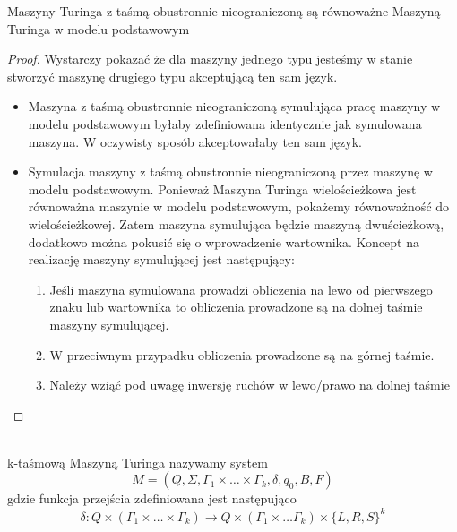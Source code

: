 \begin{tw}
	Maszyny Turinga z taśmą obustronnie nieograniczoną są równoważne Maszyną Turinga w modelu podstawowym
	
	\begin{proof}
	Wystarczy pokazać że dla maszyny jednego typu jesteśmy w stanie stworzyć maszynę drugiego typu akceptującą ten sam
	język.
	\begin{itemize}
		\item Maszyna z taśmą obustronnie nieograniczoną symulująca pracę maszyny w modelu podstawowym byłaby
		zdefiniowana identycznie jak symulowana maszyna.	W oczywisty sposób akceptowałaby ten sam język.
		\item Symulacja maszyny z taśmą obustronnie nieograniczoną przez maszynę w modelu podstawowym. 
		Ponieważ Maszyna Turinga wielościeżkowa jest równoważna maszynie w modelu podstawowym, pokażemy
		równoważność do wielościeżkowej. Zatem maszyna symulująca będzie maszyną dwuścieżkową, dodatkowo można pokusić się o 
		wprowadzenie wartownika. Koncept na realizację maszyny symulującej jest następujący:
			\begin{enumerate}
				\item Jeśli maszyna symulowana prowadzi obliczenia na lewo od pierwszego znaku lub wartownika
				to obliczenia prowadzone są na dolnej taśmie maszyny symulującej.
				\item W przeciwnym przypadku obliczenia prowadzone są na górnej taśmie.
				\item Należy wziąć pod uwagę inwersję ruchów w lewo/prawo na dolnej taśmie
			\end{enumerate}
	\end{itemize}
	\end{proof}
\end{tw}

\begin{df}~\\
	k-taśmową Maszyną Turinga nazywamy system
	\begin{equation}
		M = (Q, \Sigma, \Gamma_1\times\dots\times\Gamma_k, \delta, q_0, B, F)
	\end{equation}
	gdzie funkcja przejścia zdefiniowana jest następująco
	\begin{equation}
		\delta: Q\times(\Gamma_1\times\dots\times\Gamma_k) \rightarrow Q\times(\Gamma_1\times\dots\Gamma_k)\times\{L,R,S\}^k
	\end{equation}
\end{df}

